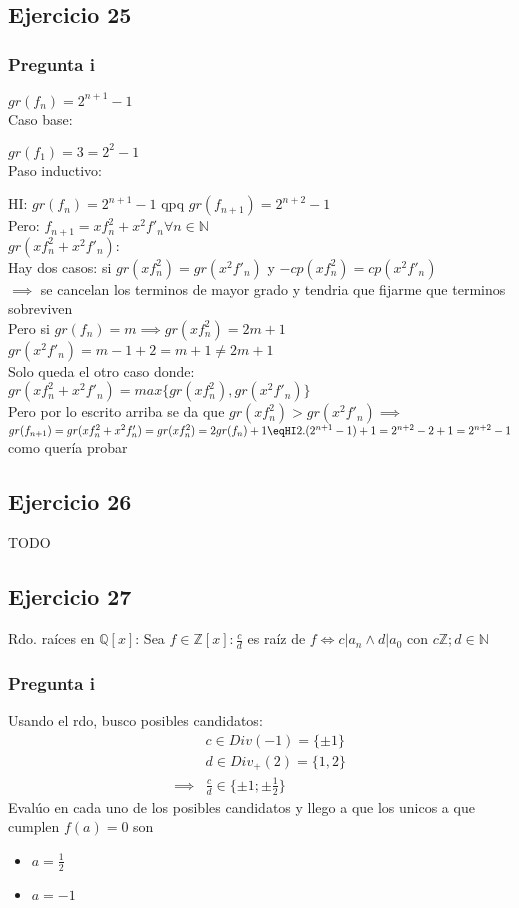 \subsection{Ejercicio 25}
\subsubsection{Pregunta i}
$gr(f_n) = 2^{n+1}-1$ \\
Caso base:

$gr(f_1) = 3 = 2^{2}-1$ \\
Paso inductivo:

HI: $gr(f_n) = 2^{n+1}-1$ qpq $gr(f_{n+1}) = 2^{n+2}-1$ \\
Pero:
$f_{n+1} = xf_{n}^{2}+x^{2}f'_n \forall n \in \mathbb{N}$ \\
$gr(xf_{n}^{2}+x^{2}f'_n):$ \\
Hay dos casos: si $gr(xf_n^2)=gr(x^{2}f'_n)$ y $-cp(xf_n^2)=cp(x^{2}f'_n)$ \\
$\implies$ se cancelan los terminos de mayor grado y tendria que fijarme que terminos sobreviven \\
Pero si $gr(f_n)=m \implies gr(xf_n^2)=2m+1$ \\
$gr(x^{2}f'_n) = m-1+2=m+1 \neq 2m+1$ \\
Solo queda el otro caso donde: \\
$gr(xf_{n}^{2}+x^{2}f'_n) = max\{gr(xf_n^2),gr(x^{2}f'_n)\}$ \\
Pero por lo escrito arriba se da que $gr(xf_n^2) > gr(x^{2}f'_n) \implies$ \\
$gr(f_{n+1})=gr(xf_{n}^{2}+x^{2}f'_n)=gr(xf_{n}^{2})=2gr(f_n)+1 \eqHI 2.(2^{n+1}-1)+1=2^{n+2}-2+1=2^{n+2}-1$ como quería probar

\subsection{Ejercicio 26}
TODO

\subsection{Ejercicio 27}
Rdo. raíces en $ \mathbb{Q}[x] $: Sea $ f \in \mathbb{Z}[x]: \frac{c}{d} $ es raíz de $ f \iff c | a_n \wedge d|a_0 $ con $ c \mathbb{Z}; d \in \mathbb{N}   $

\subsubsection{Pregunta i}
Usando el rdo, busco posibles candidatos:
\begin{align*}
    &c \in Div(-1) = \{ \pm 1 \} \\
    &d \in Div_+(2) = \{ 1,2 \} \\
    \implies &\frac{c}{d} \in \{ \pm 1; \pm \frac{1}{2} \}
\end{align*}
Evalúo en cada uno de los posibles candidatos y llego a que los unicos a que cumplen $ f(a) = 0 $ son
\begin{itemize}
    \item $ a = \frac{1}{2} $
    \item $ a = -1 $
\end{itemize}
